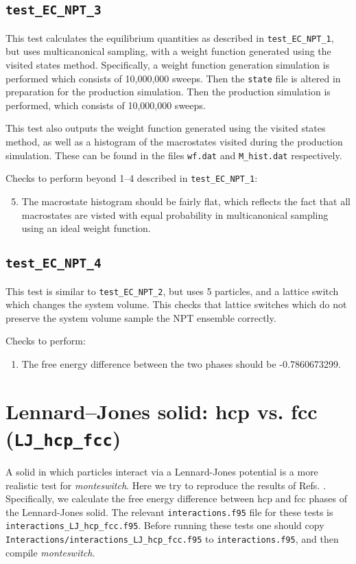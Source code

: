 \documentclass{report}
\begin{document}
\subsection{\texttt{test\_EC\_NPT\_3}}
This test calculates the equilibrium quantities as described in \texttt{test\_EC\_NPT\_1}, but uses multicanonical sampling,
with a weight function generated using the visited states method. Specifically, a weight function generation 
simulation is performed which consists of 10,000,000 sweeps. Then the \texttt{state} file is altered in preparation 
for the production simulation. Then the production simulation is performed, which consists of 10,000,000 sweeps.

This test also outputs the weight function generated using the visited states method, as well as a histogram of 
the macrostates visited during the production simulation. These can be found in the files \texttt{wf.dat} and \texttt{M\_hist.dat}
respectively. 

Checks to perform beyond  1--4 described in \texttt{test\_EC\_NPT\_1}:
\begin{enumerate}
\setcounter{enumi}{4}
\item
The macrostate histogram should be fairly flat, which reflects the fact that all macrostates are
visted with equal probability in multicanonical sampling using an ideal weight function.
\end{enumerate}


\subsection{\texttt{test\_EC\_NPT\_4}}
This test is similar to \texttt{test\_EC\_NPT\_2}, but uses 5 particles, and a lattice switch which changes the system volume.
This checks that lattice switches which do not preserve the system volume sample the NPT ensemble correctly.

Checks to perform:
\begin{enumerate}
\item
The free energy difference between the two phases should be -0.7860673299.
\end{enumerate}


\section{Lennard--Jones solid: hcp vs. fcc (\texttt{LJ\_hcp\_fcc})}
A solid in which particles interact via a Lennard-Jones potential is a more realistic test for \emph{monteswitch}.
Here we try to reproduce the results of Refs. \cite{thesis:Jackson,Jackson_2002}. Specifically, we calculate the free energy
difference between hcp and fcc phases of the Lennard-Jones solid. The relevant \texttt{interactions.f95} file for these tests is 
\texttt{interactions\_LJ\_hcp\_fcc.f95}. Before running these tests one should copy \texttt{Interactions/interactions\_LJ\_hcp\_fcc.f95}
to \texttt{interactions.f95}, and then compile \emph{monteswitch}.
\end{document}
